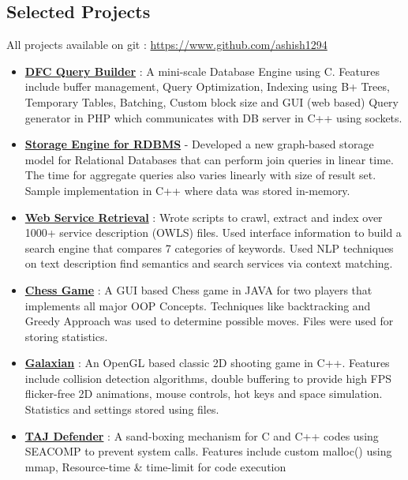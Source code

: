 \documentclass[margin, centered]{res}
\begin{document}
\begin{resume}
\section{Selected Projects}
All projects available on git : \url{https://www.github.com/ashish1294}
\begin{itemize}[leftmargin=*]
 \item \textbf{\href{https://github.com/Bug-Assassins/DFC_query_builder}{DFC Query Builder}} : A mini-scale Database Engine using C. Features include buffer management, Query Optimization, Indexing using B+ Trees, Temporary Tables, Batching, Custom block size and GUI (web based) Query generator in PHP which communicates with DB server in C++ using sockets.
 \item \textbf{\href{https://github.com/Bug-Assassins/Relational-Graph-Database}{Storage Engine for RDBMS}} - Developed a new graph-based storage model for Relational Databases that can perform join queries in linear time. The time for aggregate queries also varies linearly with size of result set. Sample implementation in C++ where data was stored in-memory.
 \item \textbf{\href{https://github.com/Bug-Assassins/web_service_retrieval}{Web Service Retrieval}} : Wrote scripts to crawl, extract and index over 1000+ service description (OWLS) files. Used interface information to build a search engine that compares 7 categories of keywords. Used NLP techniques on text description find semantics and search services via context matching.
 \item \textbf{\href{https://github.com/ashish1294/ChessOOP}{Chess Game}} : A GUI based Chess game in JAVA for two players that implements all major OOP Concepts. Techniques like backtracking and Greedy Approach was used to determine possible moves. Files were used for storing statistics.
 \item \textbf{\href{https://github.com/Bug-Assassins/Galaxian}{Galaxian}} : An OpenGL based classic 2D shooting game in C++. Features include collision detection algorithms, double buffering to provide high FPS flicker-free 2D animations, mouse controls, hot keys and space simulation. Statistics and settings stored using files.
 \item \textbf{\href{https://github.com/Bug-Assassins/TAJ-Defender}{TAJ Defender}} : A sand-boxing mechanism for C and C++ codes using SEACOMP to prevent system calls. Features include custom malloc() using mmap, Resource-time \& time-limit for code execution

\end{itemize}
\end{resume}
\end{document}
